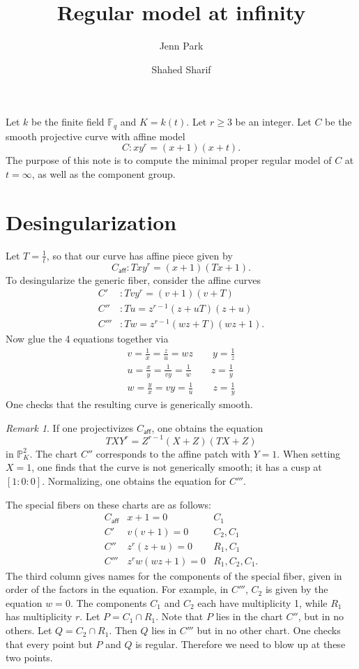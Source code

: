 \documentclass{article}
\newcommand{\caff}{C_{\textsf{aff}}}
\theoremstyle{plain}
\theoremstyle{definition}
\theoremstyle{remark}
\newtheorem{remark}[theorem]{Remark}
\newcommand{\F}{\ensuremath{\mathbb{F}}}
\newcommand{\Pro}{\ensuremath{\mathbb{P}}}
\begin{document}
\title{Regular model at infinity}
\author{Jenn Park \and Shahed Sharif}
\maketitle

Let $k$ be the finite field $\F_q$ and $K = k(t)$. Let $r \geq 3$ be an integer. Let $C$ be the smooth projective curve with affine model
\[
C: xy^r = (x+1)(x+t).
\]
The purpose of this note is to compute the minimal proper regular model of $C$ at $t = \infty$, as well as the component group.

\section{Desingularization}
\label{sec:desingularization}

Let $T = \frac{1}{t}$, so that our curve has affine piece given by
\[
\caff:Txy^r = (x+1)(Tx+1).
\]
To desingularize the generic fiber, consider the affine curves
\begin{align*}
  C'&: Tvy^r = (v+1)(v+T) \\
  C''&: Tu = z^{r-1}(z+uT)(z+u) \\
  C'''&: Tw = z^{r-1}(wz+T)(wz+1).
\end{align*}
Now glue the 4 equations together via
\begin{gather*}
  v = \frac{1}{x} = \frac{z}{u} = wz \qquad y = \frac{1}{z} \\
  u = \frac{x}{y} = \frac{1}{vy} = \frac{1}{w} \qquad z = \frac{1}{y}\\
  w = \frac{y}{x} = vy = \frac{1}{u} \qquad z = \frac{1}{y}
\end{gather*}
One checks that the resulting curve is generically smooth.
\begin{remark}
  If one projectivizes $\caff$, one obtains the equation
  \[
  TXY^r = Z^{r-1}(X+Z)(TX+Z)
  \]
  in $\Pro^2_K$. The chart $C''$ corresponds to the affine patch with $Y = 1$. When setting $X = 1$, one finds that the curve is not generically smooth; it has a cusp at $[1:0:0]$. Normalizing, one obtains the equation for $C'''$. 
\end{remark}


The special fibers on these charts are as follows:
\[
\begin{array}{lll}
\caff & x + 1 = 0 & C_1 \\
C' & v(v + 1) = 0 & C_2, C_1 \\
C'' & z^r(z + u) = 0 & R_1, C_1 \\
C''' & z^rw(wz+1) = 0 & R_1, C_2, C_1.
\end{array}
\]
The third column gives names for the components of the special fiber, given in order of the factors in the equation. For example, in $C'''$, $C_2$ is given by the equation $w = 0$. The components $C_1$ and $C_2$ each have multiplicity 1, while $R_1$ has multiplicity $r$. Let $P = C_1 \cap R_1$. Note that $P$ lies in the chart $C''$, but in no others. Let $Q = C_2 \cap R_1$. Then $Q$ lies in $C'''$ but in no other chart. One checks that every point but $P$ and $Q$ is regular. Therefore we need to blow up at these two points.
\end{document}
